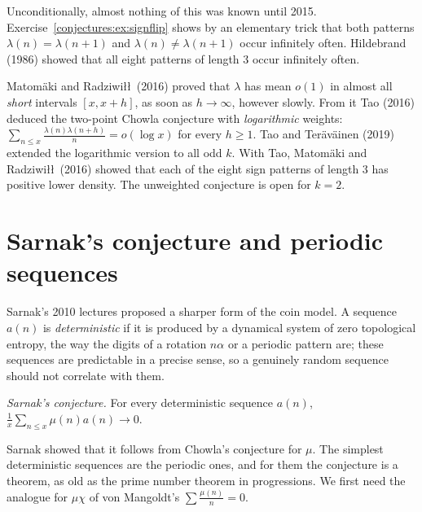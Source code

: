 Unconditionally, almost nothing of this was known until 2015. Exercise~\ref{conjectures:ex:signflip} shows by an elementary trick that both patterns $\lambda(n)=\lambda(n+1)$
and $\lambda(n)\ne\lambda(n+1)$ occur infinitely often. Hildebrand (1986) showed that all eight patterns of length $3$ occur infinitely often.

\begin{remark}\label{conjectures:rem:chowlaprogress}
Matom\"aki and Radziwi\l\l\ (2016) proved that $\lambda$ has mean $o(1)$ in almost all \emph{short} intervals $[x,x+h]$, as soon as $h\to\infty$, however
slowly. From it Tao (2016) deduced the two-point Chowla conjecture with \emph{logarithmic} weights: $\sum_{n\le x}\frac{\lambda(n)\lambda(n+h)}n=o(\log x)$
for every $h\ge1$. Tao and Ter\"av\"ainen (2019) extended the logarithmic version to all odd $k$. With Tao, Matom\"aki and Radziwi\l\l\ (2016) showed that each
of the eight sign patterns of length $3$ has positive lower density. The unweighted conjecture is open for $k=2$.
\end{remark}

\section{Sarnak's conjecture and periodic sequences}

Sarnak's 2010 lectures proposed a sharper form of the coin model. A sequence $a(n)$ is \emph{deterministic} if it is produced by a dynamical system of
zero topological entropy, the way the digits of a rotation $n\alpha$ or a periodic pattern are; these sequences are predictable in a precise sense, so a
genuinely random sequence should not correlate with them.

\begin{center}
\emph{Sarnak's conjecture.} For every deterministic sequence $a(n)$, $\frac1x\sum_{n\le x}\mu(n)a(n)\to0$.
\end{center}

Sarnak showed that it follows from Chowla's conjecture for $\mu$. The simplest deterministic sequences are the periodic ones, and for them the conjecture is
a theorem, as old as the prime number theorem in progressions. We first need the analogue for $\mu\chi$ of von Mangoldt's $\sum\frac{\mu(n)}n=0$.

